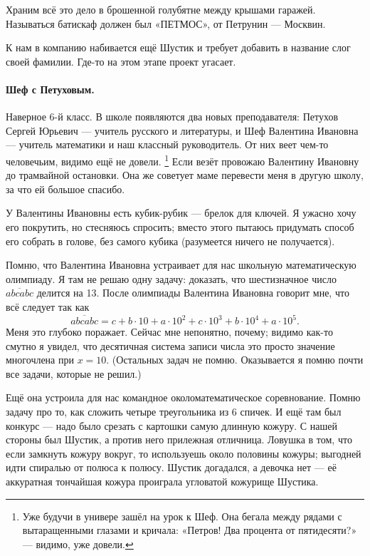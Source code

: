 \documentclass{book}
\begin{document}
Храним всё это дело в брошенной голубятне между крышами гаражей.
Называться батискаф должен был «ПЕТМОС», от Петрунин --- Москвин.

К нам в компанию набивается ещё Шустик и требует добавить в название слог своей фамилии.
Где-то на этом этапе проект угасает.

\paragraph{Шеф с Петуховым.}
Наверное 6-й класс.
В школе появляются два новых преподавателя: Петухов Сергей Юрьевич --- учитель русского и литературы, 
и Шеф Валентина Ивановна --- учитель математики и наш классный руководитель.
От них веет чем-то человечьим, видимо ещё не довели.%
\footnote{Уже будучи в универе зашёл на урок к Шеф.
Она бегала между рядами с вытаращенными глазами 
и кричала: «Петров! Два процента от пятидесяти?» 
--- видимо, уже довели.}
Если везёт провожаю Валентину Ивановну до трамвайной остановки.
Она же советует маме перевести меня в другую школу, за что ей большое спасибо.

У Валентины Ивановны есть кубик-рубик --- брелок для ключей.
Я ужасно хочу его покрутить, но стесняюсь спросить;
вместо этого пытаюсь придумать способ его собрать в голове, без самого кубика (разумеется ничего не получается).

{\sloppy 
Помню, что Валентина Ивановна устраивает для нас школьную математическую олимпиаду.
Я там не решаю одну задачу: доказать, что шестизначное число $\overline{abcabc}$ делится на 13.
После олимпиады Валентина Ивановна говорит мне, что всё следует
так как 
$$\overline{abcabc}
=
c+b\cdot 10+ a\cdot 10^2+
c\cdot 10^3+b\cdot 10^4+ a\cdot 10^5.$$
Меня это глубоко поражает. 
Сейчас мне непонятно, почему;
видимо как-то смутно я увидел, 
что десятичная система записи числа 
это просто значение многочлена при $x=10$.
(Остальных задач не помню.
Оказывается я помню почти все задачи, которые не решил.)

}

Ещё она устроила для нас командное околоматематическое соревнование.
Помню задачу про то, как сложить четыре треугольника из 6 спичек.
И ещё там был конкурс --- надо было срезать с картошки самую длинную кожуру.
С нашей стороны был Шустик, а против него прилежная отличница.
Ловушка в том, что если замкнуть кожуру вокруг, то используешь около половины кожуры; выгодней идти спиралью от полюса к полюсу.
Шустик догадался, а девочка нет --- её аккуратная тончайшая кожура проиграла угловатой кожурище Шустика.
\end{document}
